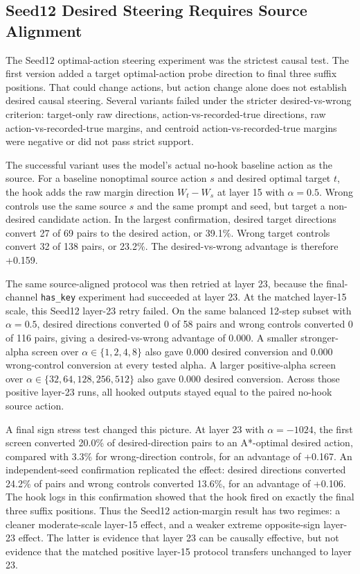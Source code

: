 \documentclass[11pt]{article}
\begin{document}
\subsection{Seed12 Desired Steering Requires Source Alignment}

The Seed12 optimal-action steering experiment was the strictest causal test.
The first version added a target optimal-action probe direction to final three suffix positions.
That could change actions, but action change alone does not establish desired causal steering.
Several variants failed under the stricter desired-vs-wrong criterion:
target-only raw directions, action-vs-recorded-true directions, raw action-vs-recorded-true margins, and centroid action-vs-recorded-true margins were negative or did not pass strict support.

The successful variant uses the model's actual no-hook baseline action as the source.
For a baseline nonoptimal source action $s$ and desired optimal target $t$, the hook adds the raw margin direction $W_t - W_s$ at layer 15 with $\alpha=0.5$.
Wrong controls use the same source $s$ and the same prompt and seed, but target a non-desired candidate action.
In the largest confirmation, desired target directions convert 27 of 69 pairs to the desired action, or 39.1\%.
Wrong target controls convert 32 of 138 pairs, or 23.2\%.
The desired-vs-wrong advantage is therefore +0.159.

The same source-aligned protocol was then retried at layer 23, because the final-channel \texttt{has\_key} experiment had succeeded at layer 23.
At the matched layer-15 scale, this Seed12 layer-23 retry failed.
On the same balanced 12-step subset with $\alpha=0.5$, desired directions converted 0 of 58 pairs and wrong controls converted 0 of 116 pairs, giving a desired-vs-wrong advantage of 0.000.
A smaller stronger-alpha screen over $\alpha\in\{1,2,4,8\}$ also gave 0.000 desired conversion and 0.000 wrong-control conversion at every tested alpha.
A larger positive-alpha screen over $\alpha\in\{32,64,128,256,512\}$ also gave 0.000 desired conversion.
Across those positive layer-23 runs, all hooked outputs stayed equal to the paired no-hook source action.

A final sign stress test changed this picture.
At layer 23 with $\alpha=-1024$, the first screen converted 20.0\% of desired-direction pairs to an A*-optimal desired action, compared with 3.3\% for wrong-direction controls, for an advantage of +0.167.
An independent-seed confirmation replicated the effect: desired directions converted 24.2\% of pairs and wrong controls converted 13.6\%, for an advantage of +0.106.
The hook logs in this confirmation showed that the hook fired on exactly the final three suffix positions.
Thus the Seed12 action-margin result has two regimes: a cleaner moderate-scale layer-15 effect, and a weaker extreme opposite-sign layer-23 effect.
The latter is evidence that layer 23 can be causally effective, but not evidence that the matched positive layer-15 protocol transfers unchanged to layer 23.
\end{document}
